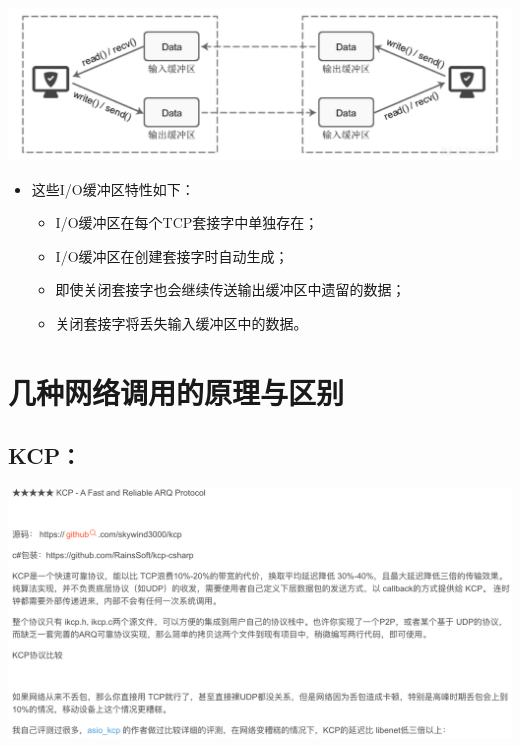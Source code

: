 \documentclass[9pt, b5paper]{article}
\begin{document}
\includegraphics[width=.9\linewidth]{./pic/readme_20230210_142230.png}
\begin{itemize}
\item 这些I/O缓冲区特性如下：
\begin{itemize}
\item I/O缓冲区在每个TCP套接字中单独存在；
\item I/O缓冲区在创建套接字时自动生成；
\item 即使关闭套接字也会继续传送输出缓冲区中遗留的数据；
\item 关闭套接字将丢失输入缓冲区中的数据。
\end{itemize}
\end{itemize}

\section{几种网络调用的原理与区别}
\label{sec-4}
\subsection{KCP：}
\label{sec-4-1}

\includegraphics[width=.9\linewidth]{./pic/readme_20230210_101745.png}
\end{document}
